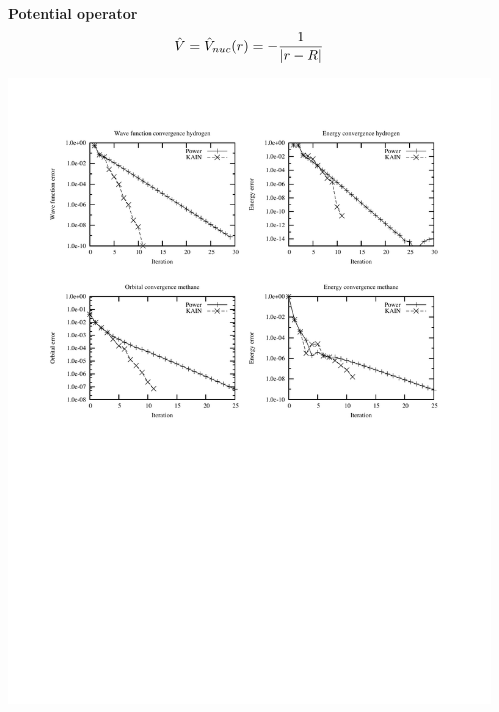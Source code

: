 \begin{frame}
\begin{columns}
\begin{column}[b]{0.4\textwidth}
    \end{column}
    \begin{column}[b]{0.6\textwidth}
      \centering
      \textbf{Potential operator}
      \begin{equation}
        \nonumber
        \hat{V} = \hat{V}_{nuc}(r) = -\frac{1}{|r-R|}
      \end{equation}
      \begin{center}
        \includegraphics[scale=0.8, clip, viewport = 50 550 300 730]{figures/convergence.pdf}
      \end{center}
    \end{column}
  \end{columns}
\end{frame}

